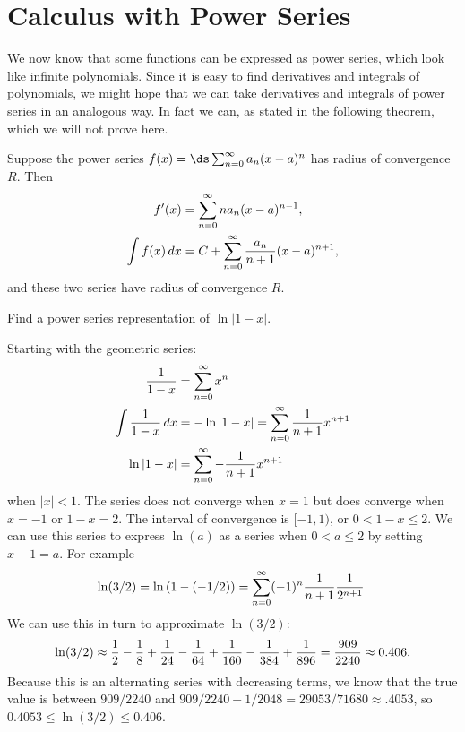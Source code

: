\section{Calculus with Power Series}\label{sec:CalculuswithPowerSeries}

We now know that some functions can be expressed as power series,
which look like infinite polynomials. Since it is easy to find derivatives
and integrals of polynomials, we might hope that we can take derivatives
and integrals of power series in an analogous way. In fact we can, as stated
in the following theorem, which we will not prove here.

\begin{theorem}{}{}
Suppose the power series $f(x)=\ds\sum_{n=0}^\infty a_n(x-a)^n$ has
radius of convergence $R$. Then
\begin{align*}
  f'(x)&=\sum_{n=0}^\infty na_n(x-a)^{n-1},	\\
  \int f(x)\,dx &= C+\sum_{n=0}^\infty {a_n\over n+1}(x-a)^{n+1},
\end{align*}
and these two series have radius of convergence $R$.
\end{theorem}

\begin{example}{}{}
Find a power series representation of $\ln|1-x|$.
\end{example}
\begin{solution}
Starting with the geometric series:
\begin{align*}
  {1\over 1-x} &= \sum_{n=0}^\infty x^n	\\
  \int{1\over 1-x}\,dx &= -\ln|1-x| = \sum_{n=0}^\infty {1\over n+1}x^{n+1}	\\
  \ln|1-x| &= \sum_{n=0}^\infty -{1\over n+1}x^{n+1}
\end{align*}
when $|x|<1$. The series does not converge when $x=1$ but does
converge when $x=-1$ or $1-x=2$. The interval of convergence is
$[-1,1)$, or $0<1-x\le2$.
We can use this series to express $\ln(a)$ as a series
when $0<a\le2$ by setting $x-1=a$. For example
$$
  \ln(3/2)=\ln\left(1-(-1/2)\right)=
  \sum_{n=0}^\infty (-1)^n{1\over n+1}{1\over 2^{n+1}}.
$$
We can use this in turn to approximate $\ln(3/2)$:
$$
  \ln(3/2)\approx {1\over 2}-{1\over 8}+{1\over 24}-{1\over 64}
  +{1\over 160}-{1\over 384}+{1\over 896}
  ={909\over 2240}\approx 0.406
.$$
Because this is an alternating series with decreasing terms,
we know that the true value is between $909/2240$ and
$909/2240-1/2048=29053/71680\approx .4053$, so $0.4053\leq\ln(3/2)\leq 0.406$.
\end{solution}


